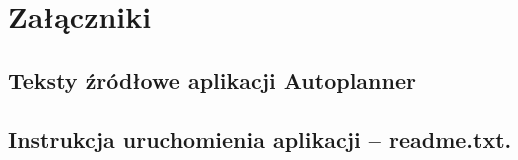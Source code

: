 \chapter{Załączniki}
\section{Teksty źródłowe aplikacji Autoplanner}
\section{Instrukcja uruchomienia aplikacji -- readme.txt.}
